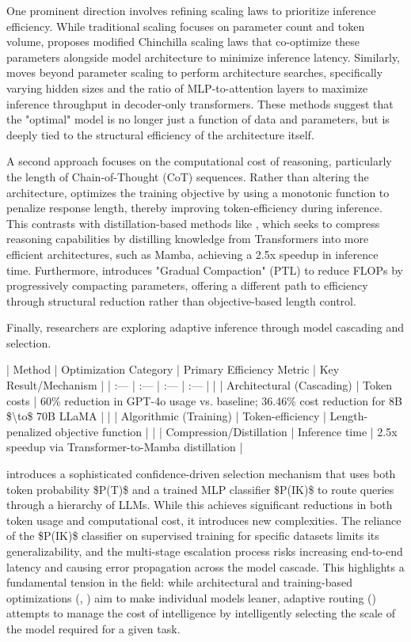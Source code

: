 \documentclass[11pt]{article}
\begin{document}
One prominent direction involves refining scaling laws to prioritize inference efficiency. While traditional scaling focuses on parameter count and token volume, \citep{2501.18107} proposes modified Chinchilla scaling laws that co-optimize these parameters alongside model architecture to minimize inference latency. Similarly, \citep{2510.18245} moves beyond parameter scaling to perform architecture searches, specifically varying hidden sizes and the ratio of MLP-to-attention layers to maximize inference throughput in decoder-only transformers. These methods suggest that the "optimal" model is no longer just a function of data and parameters, but is deeply tied to the structural efficiency of the architecture itself.

A second approach focuses on the computational cost of reasoning, particularly the length of Chain-of-Thought (CoT) sequences. Rather than altering the architecture, \citep{2502.04463} optimizes the training objective by using a monotonic function to penalize response length, thereby improving token-efficiency during inference. This contrasts with distillation-based methods like \citep{2502.20339}, which seeks to compress reasoning capabilities by distilling knowledge from Transformers into more efficient architectures, such as Mamba, achieving a 2.5x speedup in inference time. Furthermore, \citep{2602.04919} introduces "Gradual Compaction" (PTL) to reduce FLOPs by progressively compacting parameters, offering a different path to efficiency through structural reduction rather than objective-based length control.

Finally, researchers are exploring adaptive inference through model cascading and selection.

| Method | Optimization Category | Primary Efficiency Metric | Key Result/Mechanism |
| :--- | :--- | :--- | :--- |
| \citep{2602.22090} | Architectural (Cascading) | Token costs | 60\% reduction in GPT-4o usage vs. baseline; 36.46\% cost reduction for 8B \$\textbackslash{}to\$ 70B LLaMA |
| \citep{2502.04463} | Algorithmic (Training) | Token-efficiency | Length-penalized objective function |
| \citep{2502.20339} | Compression/Distillation | Inference time | 2.5x speedup via Transformer-to-Mamba distillation |

\citep{2602.22090} introduces a sophisticated confidence-driven selection mechanism that uses both token probability \$P(T)\$ and a trained MLP classifier \$P(IK)\$ to route queries through a hierarchy of LLMs. While this achieves significant reductions in both token usage and computational cost, it introduces new complexities. The reliance of the \$P(IK)\$ classifier on supervised training for specific datasets limits its generalizability, and the multi-stage escalation process risks increasing end-to-end latency and causing error propagation across the model cascade. This highlights a fundamental tension in the field: while architectural and training-based optimizations (\citep{2501.18107}, \citep{2502.04463}) aim to make individual models leaner, adaptive routing (\citep{2602.22090}) attempts to manage the cost of intelligence by intelligently selecting the scale of the model required for a given task.
\end{document}

